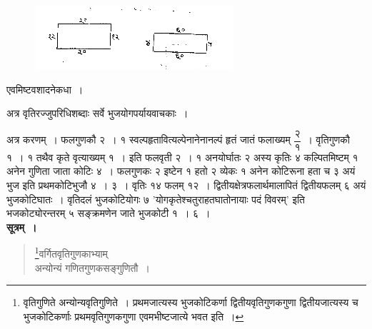 \documentclass[11pt, openany]{book}
\begin{document}
\begin{figure}[h!]
     \centering
     \includegraphics[scale=0.85]{graphics/capture134.png}
\end{figure} 
\vspace{-2mm}

 एवमिष्टवशादनेकधा~। \\
\vspace{-4mm}

 अत्र वृतिरज्जुपरिधिशब्दाः सर्वे भुजयोगपर्यायवाचकाः~। \\
\vspace{-4mm}

अत्र करणम्~। फलगुणकौ २~। १ स्वल्पहृतावित्यल्पेनानेनानल्पं हृतं जातं फलाख्यम् $\dfrac{\mbox{२}}{\mbox{१}}$~। वृतिगुणकौ १~। १ तथैव कृते वृत्याख्यम् १~। इति फलवृती २~। १ अनयोर्घातः २ अस्य कृतिः ४ कल्पितमिष्टम् १ अनेन गुणिता जाता कोटिः ४~। फलगुणकः २ इष्टेन १ हतो २ व्येकः १ अनेन कोटिरूना हता च ३ अयं भुज इति प्रथमकोटिभुजौ ४~। ३~। वृतिः १४ फलम् १२~। द्वितीयक्षेत्रफलार्थमालापितं द्वितीयफलम् ६ अयं भुजकोटिघातः~। वृतिदलं
भुजकोटियोगः ७ 'योगकृतेश्चतुराहतघातोनायाः पदं विवरम्' इति
भजकोट्योरन्तरम् ५ सङ्क्रमणेन जाते भुजकोटी १~। ६~। \\

\textbf{सूत्रम्~।} 

\begin{quote}
    \bs 
    \footnote{वृतिगुणिते अन्योन्यवृतिगुणिते~। प्रथमजात्यस्य भुजकोटिकर्णा द्वितीयवृतिगुणकगुणा द्वितीयजात्यस्य च भुजकोटिकर्णाः प्रथमवृतिगुणकगुणा एवमभीष्टजात्ये भवत इति~। }वर्गितवृतिगुणकाभ्याम् \\
अन्योन्यं गणितगुणकसङ्गुणितौ~। 
\end{quote}

\newpage
\end{document}
